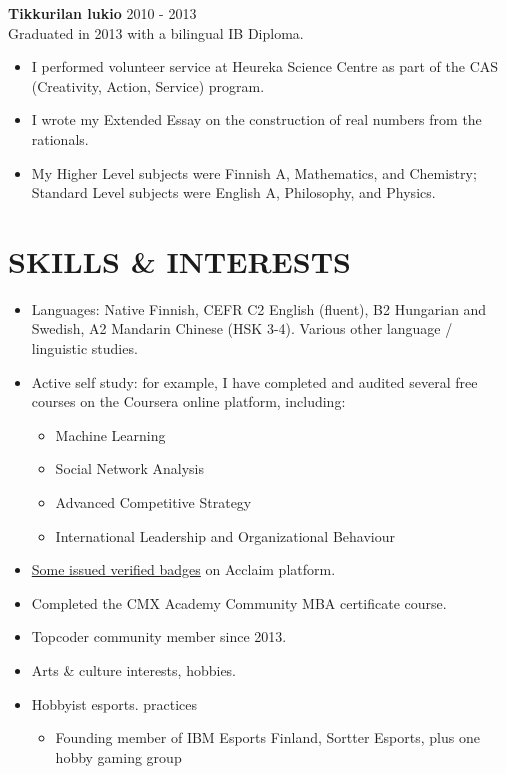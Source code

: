 \documentclass[margin, 10pt]{res} %
\begin{document}
\begin{resume}
\addvspace{-7pt}
\textbf{Tikkurilan lukio} \hfill 2010 - 2013\\
Graduated in 2013 with a bilingual IB Diploma.
\begin{itemize} \itemsep -2pt
\item I performed volunteer service at Heureka Science Centre as part of the CAS (Creativity, Action, Service) program.
\item I wrote my Extended Essay on the construction of real numbers from the rationals.
\item My Higher Level subjects were Finnish A, Mathematics, and Chemistry; Standard Level subjects were English A, Philosophy, and Physics. 
\end{itemize}



\section{SKILLS \& INTERESTS}
\begin{itemize} \itemsep -2pt
\item Languages: Native Finnish, CEFR C2 English (fluent), B2 Hungarian and Swedish, A2 Mandarin Chinese (HSK 3-4). Various other language / linguistic studies.
\item Active self study: for example, I have completed and audited several free courses on the Coursera online platform, including:
  \begin{itemize} \itemsep -2pt
  \item Machine Learning
  \item Social Network Analysis
  \item Advanced Competitive Strategy
  \item International Leadership and Organizational Behaviour
  \end{itemize}
\item \href{https://www.youracclaim.com/users/pentti-sunila/badges}{Some issued verified badges} on Acclaim platform.
\item Completed the CMX Academy Community MBA certificate course.
\item Topcoder community member since 2013.
\item Arts \& culture interests, hobbies.
\item Hobbyist esports. practices
\begin{itemize}
	\item Founding member of IBM Esports Finland, Sortter Esports, plus one hobby  gaming group

\end{itemize}
\end{itemize}
\end{resume}
\end{document}
